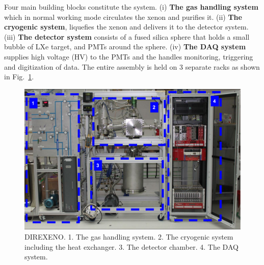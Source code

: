Four main building blocks constitute the system. (i) \textbf{The gas handling system} which in normal working mode circulates the xenon and purifies it. (ii) \textbf{The cryogenic system}, liquefies the xenon and 
delivers it to the detector system. (iii) \textbf{The detector system} consists of a fused silica sphere that 
holds a small bubble of LXe target, and PMTs around the sphere. (iv) \textbf{The DAQ system} supplies high voltage (HV) 
to the PMTs and the handles monitoring, triggering and digitization of data. The entire assembly is held on 3 separate racks as shown in Fig.~\ref{fig:fulldet}.
 






\begin{figure}[h]
\centerline{\includegraphics[width=0.8\linewidth]{FullSys.png}}
\caption{DIREXENO. 1. The gas handling system. 2. The cryogenic system including the heat exchanger. 3. The detector chamber. 4. The DAQ system.}
\label{fig:fulldet}
\end{figure}



